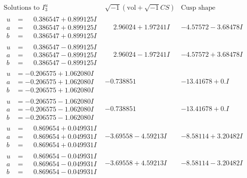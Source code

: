 \documentclass[1p]{elsarticle_modified}
\theoremstyle{definition}
\newcommand{\I}{\sqrt{-1}}
\begin{document}
$$\begin{array}{c|c|c}  
\text{Solutions to }I^u_{3}& \I (\text{vol} + \sqrt{-1}CS) & \text{Cusp shape}\\
 \hline 
\begin{aligned}
u &= \phantom{-}0.386547 + 0.899125 I \\
a &= \phantom{-}0.386547 + 0.899125 I \\
b &= \phantom{-}0.386547 + 0.899125 I\end{aligned}
 & \phantom{-}2.96024 + 1.97241 I & -4.57572 - 3.68478 I \\ \hline\begin{aligned}
u &= \phantom{-}0.386547 - 0.899125 I \\
a &= \phantom{-}0.386547 - 0.899125 I \\
b &= \phantom{-}0.386547 - 0.899125 I\end{aligned}
 & \phantom{-}2.96024 - 1.97241 I & -4.57572 + 3.68478 I \\ \hline\begin{aligned}
u &= -0.206575 + 1.062080 I \\
a &= -0.206575 + 1.062080 I \\
b &= -0.206575 + 1.062080 I\end{aligned}
 & -0.738851\phantom{ +0.000000I} & -13.41678 + 0. I\phantom{ +0.000000I} \\ \hline\begin{aligned}
u &= -0.206575 - 1.062080 I \\
a &= -0.206575 - 1.062080 I \\
b &= -0.206575 - 1.062080 I\end{aligned}
 & -0.738851\phantom{ +0.000000I} & -13.41678 + 0. I\phantom{ +0.000000I} \\ \hline\begin{aligned}
u &= \phantom{-}0.869654 + 0.049931 I \\
a &= \phantom{-}0.869654 + 0.049931 I \\
b &= \phantom{-}0.869654 + 0.049931 I\end{aligned}
 & -3.69558 - 4.59213 I & -8.58114 + 3.20482 I \\ \hline\begin{aligned}
u &= \phantom{-}0.869654 - 0.049931 I \\
a &= \phantom{-}0.869654 - 0.049931 I \\
b &= \phantom{-}0.869654 - 0.049931 I\end{aligned}
 & -3.69558 + 4.59213 I & -8.58114 - 3.20482 I \\ \hline\begin{aligned}

\end{aligned}
\end{array}$$
\end{document}
